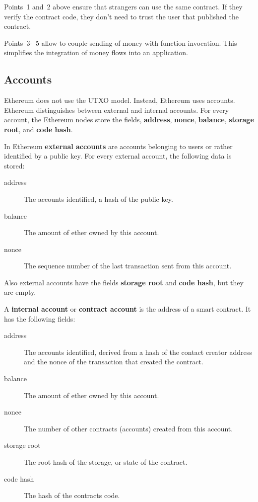 \begin{note}
Points~1 and~2 above ensure that strangers can use the same contract. If they verify the contract code, they don't need to trust the user that published the contract.

Points~3-~5 allow to couple sending of money with function invocation. This simplifies the integration of money flows into an application.
\end{note}

\subsection{Accounts}
\noindent
Ethereum does not use the UTXO model. Instead, Ethereum uses accounts.
Ethereum distinguishes between external and internal accounts.
For every account, the Ethereum nodes store the fields, \textbf{address}, \textbf{nonce}, \textbf{balance}, \textbf{storage root}, and \textbf{code hash}.

\begin{definition}
In Ethereum \textbf{external accounts} are accounts belonging to users or rather identified by a public key. For every external account, the following data is stored:
\begin{description}
	\item[address] The accounts identified, a hash of the public key.
	\item[balance] The amount of ether owned by this account.
	\item[nonce] The sequence number of the last transaction sent from this account.
\end{description}
Also external accounts have the fields \textbf{storage root} and \textbf{code hash}, but they are empty.
\end{definition}

\begin{definition}
A \textbf{internal account} or \textbf{contract account} is the address of a 
smart contract. It has the following fields:
\begin{description}
	\item[address] The accounts identified, derived from a hash of the contact creator address and the nonce of the transaction that created the contract.
	\item[balance] The amount of ether owned by this account.
	\item[nonce] The number of other contracts (accounts) created from this account.
	\item[storage root] The root hash of the storage, or state of the contract.
	\item[code hash] The hash of the contracts code.
\end{description}
\end{definition}

